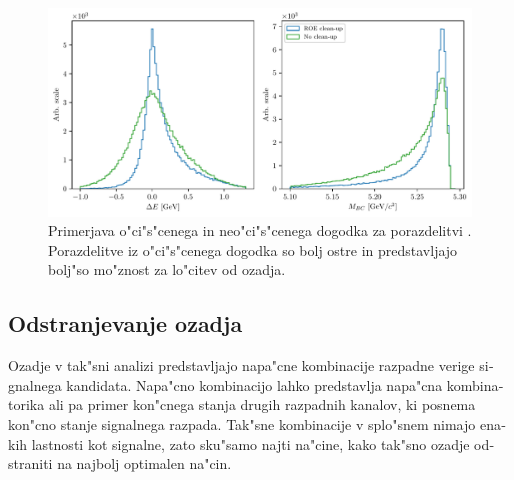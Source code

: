 \begin{otherlanguage}{slovene}
\begin{figure}[H]
	\centering
	\captionsetup{width=0.8\linewidth}
	\includegraphics[width=\linewidth]{fig/roe_opt_si}
	\caption{Primerjava o"ci"s"cenega in neo"ci"s"cenega dogodka za porazdelitvi \varss. Porazdelitve iz o"ci"s"cenega dogodka so bolj ostre in predstavljajo bolj"so mo"znost za lo"citev od ozadja.}
	\label{fig:roe_cleanup_si}
\end{figure}

\subsection{Odstranjevanje ozadja}

Ozadje v tak"sni analizi predstavljajo napa"cne kombinacije razpadne verige signalnega kandidata. Napa"cno kombinacijo lahko predstavlja napa"cna kombinatorika ali pa primer kon"cnega stanja drugih razpadnih kanalov, ki posnema kon"cno stanje signalnega razpada. Tak"sne kombinacije v splo"snem nimajo enakih lastnosti kot signalne, zato sku"samo najti na"cine, kako tak"sno ozadje odstraniti na najbolj optimalen na"cin.


\end{otherlanguage}
